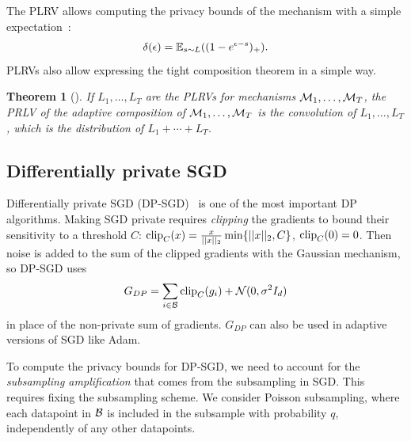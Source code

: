 \documentclass{article}
\theoremstyle{plain}
\newtheorem{theorem}{Theorem}[section]
\theoremstyle{definition}
\theoremstyle{remark}
\begin{document}
The PLRV allows computing the privacy bounds of the mechanism
with a simple expectation~\citep{sommerPrivacyLossClasses2019}: 
\begin{equation}
    \delta(\epsilon) = \operatorname{\mathbb{E}}_{s\sim L}((1 - e^{\epsilon - s})_+).\label{eq:plrv-to-delta}
\end{equation}
PLRVs also allow expressing the tight composition theorem in a simple way.
\begin{theorem}[\citealt{sommerPrivacyLossClasses2019}]\label{thm:plrv-composition}
    If $L_1, \dotsc, L_T$ are the PLRVs for mechanisms $\mathcal{M}_1, \dotsc, \mathcal{M}_T$,
    the PRLV of the adaptive composition of $\mathcal{M}_1, \dotsc, \mathcal{M}_T$ is 
    the convolution of $L_1, \dotsc, L_T$, which is the distribution of 
    $L_1 + \dotsb + L_T$.
\end{theorem}

\subsection{Differentially private SGD}\label{sec:dp-sgd}
Differentially private SGD 
(DP-SGD)~\citep{songStochasticGradientDescent2013,bassilyPrivateEmpiricalRisk2014,abadiDeepLearningDifferential2016} 
is one of the most important DP algorithms. Making SGD private 
requires \emph{clipping} the gradients to bound their sensitivity to a threshold $C$:
$\mathrm{clip}_C(x) = \frac{x}{||x||_2}\min\{||x||_2, C\}$, $\mathrm{clip}_C(0) = 0$. Then noise is 
added to the sum of the clipped gradients with the Gaussian mechanism, 
so DP-SGD uses 
\begin{equation}
    \label{eq:dp_sgd_gradients}
    G_{DP} = \sum_{i\in \mathcal{B}}\mathrm{clip}_C(g_i) + \mathcal{N}(0, \sigma^2I_d)
\end{equation}
in place of the non-private sum of gradients. $G_{DP}$ can also be used in
adaptive versions of SGD like Adam. 

To compute the privacy bounds for DP-SGD, we need to account for 
the \emph{subsampling amplification} that comes from the subsampling
in SGD. This requires fixing the subsampling scheme. We consider 
Poisson subsampling, where each datapoint in $\mathcal{B}$ is included 
in the subsample with probability $q$, independently of any other 
datapoints.
\end{document}
